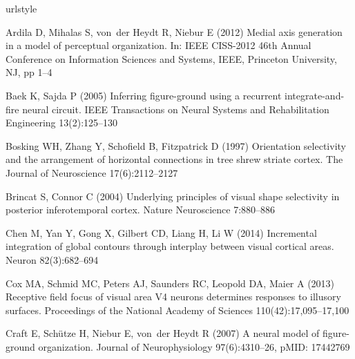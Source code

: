 \begin{thebibliography}{90}
\providecommand{\natexlab}[1]{#1}
\providecommand{\url}[1]{{#1}}
\providecommand{\urlprefix}{URL }
\expandafter\ifx\csname urlstyle\endcsname\relax
  \providecommand{\doi}[1]{DOI~\discretionary{}{}{}#1}\else
  \providecommand{\doi}{DOI~\discretionary{}{}{}\begingroup
  \urlstyle{rm}\Url}\fi
\providecommand{\eprint}[2][]{\url{#2}}

Ardila D, Mihalas S, von~der Heydt R, Niebur E (2012) {M}edial axis generation
  in a model of perceptual organization. In: IEEE CISS-2012 46th Annual
  Conference on Information Sciences and Systems, IEEE, Princeton University,
  NJ, pp 1--4

Baek K, Sajda P (2005) {I}nferring figure-ground using a recurrent
  integrate-and-fire neural circuit. IEEE Transactions on Neural Systems and
  Rehabilitation Engineering 13(2):125--130

Bosking WH, Zhang Y, Schofield B, Fitzpatrick D (1997) {O}rientation
  selectivity and the arrangement of horizontal connections in tree shrew
  striate cortex. The Journal of Neuroscience 17(6):2112--2127

Brincat S, Connor C (2004) {U}nderlying principles of visual shape selectivity
  in posterior inferotemporal cortex. Nature Neuroscience 7:880--886

Chen M, Yan Y, Gong X, Gilbert CD, Liang H, Li W (2014) {I}ncremental
  integration of global contours through interplay between visual cortical
  areas. Neuron 82(3):682--694

Cox MA, Schmid MC, Peters AJ, Saunders RC, Leopold DA, Maier A (2013)
  {R}eceptive field focus of visual area {V}4 neurons determines responses to
  illusory surfaces. Proceedings of the National Academy of Sciences
  110(42):17,095--17,100

Craft E, Sch{\"u}tze H, Niebur E, von~der Heydt R (2007) {A} neural model of
  figure-ground organization. Journal of Neurophysiology 97(6):4310--26, pMID:
  17442769


\end{thebibliography}
